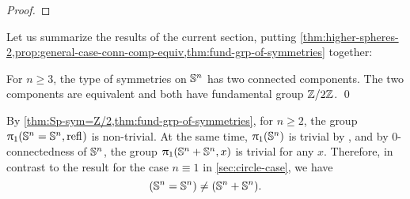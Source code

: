 \documentclass[english,a4paper]{lmcs}
\begin{document}
\begin{proof}
\end{proof}


Let us summarize the results of the current section, putting \cref{thm:higher-spheres-2,prop:general-case-conn-comp-equiv,thm:fund-grp-of-symmetries} together:

\begin{thm}
    For $n \geq 3$, the type of symmetries on ${\mathbb S^{n}}$ has two connected components. The two components are equivalent and both have fundamental group $\mathbb{Z} \slash 2\mathbb{Z}$. \qed
\end{thm}


\begin{rem}\label{rem:not-generalising}
	By \cref{thm:Sp-sym=Z/2,thm:fund-grp-of-symmetries}, for $n \geq 2$, the group $\uppi_{1}({\mathbb S^{n}} = {\mathbb S^{n}}, \mathop{{\mathrm{refl}}_{}})$ is non-trivial. At the same time, $\uppi_{1}({\mathbb S^{n}})$ is trivial by \cite{HoTT}, and by $0$-connectedness of ${\mathbb S^{n}}$, the group
	$\uppi_{1}({\mathbb S^{n}} + {\mathbb S^{n}}, x)$ is trivial for any $x$.
	Therefore, in contrast to the result for the case $n \equiv 1$ in \cref{sec:circle-case}, we have
	\begin{equation}
	({\mathbb S^{n}} = {\mathbb S^{n}}) \not= ({\mathbb S^{n}} + {\mathbb S^{n}}).
	\end{equation}
\end{rem}
\end{document}
